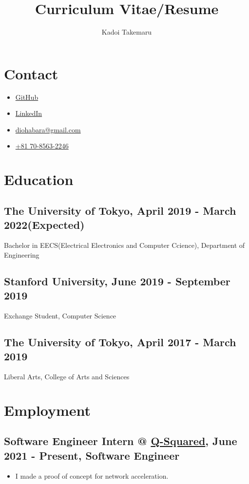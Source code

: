 \documentclass[12pt]{article}
\title{\vspace{-1cm}Curriculum Vitae/Resume}
\author{Kadoi Takemaru}
\date{}
\begin{document}
\maketitle

\section*{Contact}
  \begin{itemize}
    \item \href{https://github.com/diohabara/}{GitHub}
    \item \href{https://www.linkedin.com/in/takemaru-kadoi-6950b5172/}{LinkedIn}
    \item \href{mailto:diohabara@gmail.com}{diohabara@gmail.com}
    \item \href{tel:817085632246}{+81 70-8563-2246}
  \end{itemize}

\section*{Education}
  \subsection*{The University of Tokyo, April 2019 - March 2022(Expected)}
    Bachelor in EECS(Electrical Electronics and Computer Ccience), Department of Engineering
  \subsection*{Stanford University, June 2019 - September 2019}
    Exchange Student, Computer Science
  \subsection*{The University of Tokyo, April 2017 - March 2019}
    Liberal Arts, College of Arts and Sciences

\section*{Employment}
  \subsection*{Software Engineer Intern @ \href{https://q-squared.jp}{Q-Squared}, June 2021 - Present, Software Engineer}
    \begin{itemize}
      \item I made a proof of concept for network acceleration.
    \end{itemize}
\end{document}
